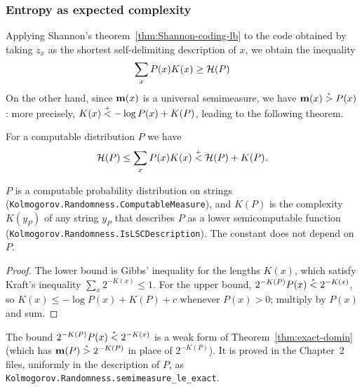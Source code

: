 \subsubsection{Entropy as expected complexity}
Applying Shannon's theorem~\ref{thm:Shannon-coding-lb}
to the code obtained by taking \( z_{x} \) as the
shortest self-delimiting description of \( x \), we obtain the inequality
 \[
   \sum_{x} P(x)K(x) \ge \mathcal{H}(P)
 \]
On the other hand, since \( \mathbf{m}(x) \) is a universal semimeasure, we have
\( \mathbf{m}(x) \stackrel{{}_*}{>} P(x) \): more precisely, \( K(x) \stackrel{{}_+}{<} -\log P(x) + K(P) \), 
leading to the following theorem.

 \begin{theorem}
  \label{thm:g3.1.3}
  \leanok
For a computable distribution \( P \) we have
 \begin{equation}\label{eq:exp-entr-compl}
   \mathcal{H}(P) \le \sum_{x} P(x)K(x) \stackrel{{}_+}{<} \mathcal{H}(P) + K(P).
 \end{equation}
 \end{theorem}

\begin{formalization}
\( P \) is a computable probability distribution on strings
(\texttt{Kolmogorov.Randomness.ComputableMeasure}), and \( K(P) \) is the complexity
\( K(y_{P}) \) of any string \( y_{P} \) that describes \( P \) as a lower semicomputable
function (\texttt{Kolmogorov.Randomness.IsLSCDescription}). The constant does not depend on
\( P \).
\end{formalization}

\begin{proof}
  \leanok
The lower bound is Gibbs' inequality for the lengths \( K(x) \), which satisfy Kraft's
inequality \( \sum_{x} 2^{-K(x)} \le 1 \). For the upper bound,
\( 2^{-K(P)} P(x) \stackrel{{}_*}{<} 2^{-K(x)} \), so \( K(x) \le -\log P(x) + K(P) + c \) whenever
\( P(x) > 0 \); multiply by \( P(x) \) and sum.
\end{proof}

\begin{formalization}
The bound \( 2^{-K(P)} P(x) \stackrel{{}_*}{<} 2^{-K(x)} \) is a weak form of
Theorem~\ref{thm:exact-domin} (which has \( \mathbf{m}(P) \stackrel{{}_*}{>} 2^{-K(P)} \) in place of
\( 2^{-K(P)} \)). It is proved in the Chapter~2 files, uniformly in the description of
\( P \), as \texttt{Kolmogorov.Randomness.semimeasure\_le\_exact}.
\end{formalization}

